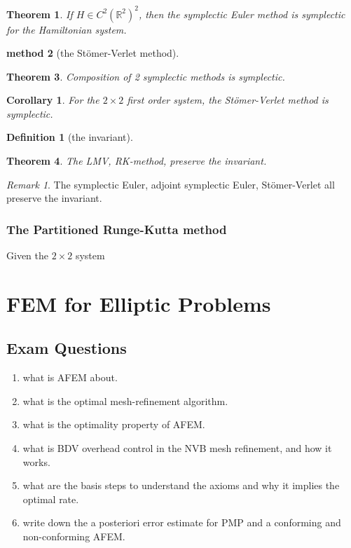 \documentclass[a4paper,12pt,oneside,fleqn]{book}
\newtheorem{theorem}{Theorem}[section]
\newtheorem{corollary}{Corollary}[theorem]
\newtheorem{method}[theorem]{method}
\theoremstyle{definition}
\newtheorem{definition}{Definition}[section]
\theoremstyle{remark}
\newtheorem*{remark}{Remark}
\begin{document}
\begin{theorem}
	If $H \in C^2(\mathbb{R}^2)^2$, then the symplectic Euler method is symplectic for the Hamiltonian system. 
\end{theorem}


\begin{method}[the St\"omer-Verlet method]
	
\end{method}


\begin{theorem}
	Composition of 2 symplectic methods is symplectic. 
\end{theorem}

\begin{corollary}
	For the $2 \times 2$ first order system, the St\"omer-Verlet method is symplectic. 
\end{corollary}


\begin{definition}[the invariant]
	
\end{definition}

\begin{theorem}
	The LMV, RK-method, preserve the invariant. 
\end{theorem}
\begin{remark}
The symplectic Euler, adjoint symplectic Euler, St\"omer-Verlet all preserve the invariant. 	
\end{remark}

\subsection{The Partitioned Runge-Kutta method }
Given the $2 \times 2$ system



\chapter{FEM for Elliptic Problems}
\section*{Exam Questions}
\begin{enumerate}
	\item what is AFEM about.
	\item what is the optimal mesh-refinement algorithm.
	\item what is the optimality property of AFEM.
	\item what is BDV overhead control in the NVB mesh refinement, and how it works.
	\item what are the basis steps to understand the axioms and why it implies the optimal rate.
	\item write down the a posteriori error estimate for PMP and a conforming and non-conforming AFEM. 
\end{enumerate}
\end{document}
